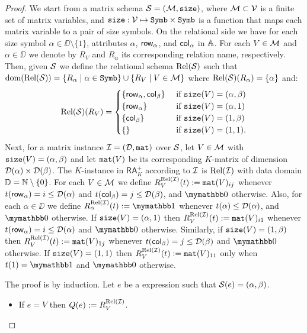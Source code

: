 \begin{proof}

We start from a matrix schema $\mathcal{S}=(\mathcal{M},\texttt{size})$, where $\mathcal{M}\subset \mathcal{V}$ is a finite set of matrix variables, 
and $\texttt{size}: \mathcal{V} \mapsto \texttt{Symb}\times \texttt{Symb}$ is a function that maps each matrix variable to a pair of size symbols. 
On the relational side we have for each size symbol $\alpha\in\DD\setminus\{1\}$, attributes $\alpha$, $\mathsf{row}_\alpha$, 
and $\mathsf{col}_\alpha$ in $\mathbb{A}$. For each $V\in\mathcal{M}$ and $\alpha \in \DD$ we denote
by $R_V$ and $R_\alpha$ its corresponding relation name, respectively. Then, given $\mathcal{S}$ we define the relational 
schema $\text{Rel}(\mathcal{S})$ such that $\operatorname{dom}(\text{Rel}(\mathcal{S})) =  \{R_\alpha \mid \alpha\in\texttt{Symb}\} \cup \{R_V \mid V \in \mathcal{M}\}$ 
where $\text{Rel}(\mathcal{S})(R_\alpha) = \{\alpha\}$ and:
\[
\text{Rel}(\mathcal{S})(R_V) = \begin{cases}
\lbrace\mathsf{row}_\alpha,\mathsf{col}_\beta \rbrace & \text{ if $ \texttt{size}(V)=(\alpha,\beta)$} \\
\lbrace\mathsf{row}_\alpha \rbrace & \text{ if $ \texttt{size}(V)=(\alpha,1)$} \\
\lbrace\mathsf{col}_\beta \rbrace  &
\text{ if $ \texttt{size}(V)=(1,\beta)$} \\
\lbrace\rbrace & \text{ if $\texttt{size}(V)=(1,1)$}.
\end{cases}
\]
Next, for a matrix instance $\mathcal{I} = (\mathcal{D},\texttt{mat})$ over $\mathcal{S}$,
let $V\in\mathcal{M}$ with $\texttt{size}(V)=(\alpha,\beta)$ and let $\texttt{mat}(V)$ be its corresponding $K$-matrix of dimension $\mathcal{D}(\alpha)\times \mathcal{D}(\beta)$.
The $K$-instance in $\mathsf{RA}_{K}^+$ according to $\mathcal{I}$ is $\text{Rel}(\mathcal{I})$ with data domain $\mathbb{D} = \mathbb{N} \setminus \{0\}$. For each $V\in\mathcal{M}$ we define 
$R_V^{\text{Rel}(\mathcal{I})}(t):=\texttt{mat}(V)_{ij}$ whenever $t(\mathsf{row}_\alpha) = i \leq \mathcal{D}(\alpha)$ and $t(\mathsf{col}_\beta) = j \leq \mathcal{D}(\beta)$, and $\kzero$ otherwise. 
Also, for each $\alpha \in \DD$ we define $R_\alpha^{\text{Rel}(\I)}(t):=\kone$ whenever $t(\alpha) \leq \mathcal{D}(\alpha)$, and $\kzero$ otherwise.
If $\texttt{size}(V)=(\alpha,1)$ then $R_V^{\text{Rel}(\mathcal{I})}(t):=\texttt{mat}(V)_{i1}$ whenever $t(\mathsf{row}_\alpha) = i \leq \mathcal{D}(\alpha)$ and $\kzero$ otherwise.
Similarly, if $\texttt{size}(V)=(1,\beta)$ then $R_V^{\text{Rel}(\mathcal{I})}(t):=\texttt{mat}(V)_{1j}$ whenever $t(\mathsf{col}_\beta) = j \leq \mathcal{D}(\beta)$ and $\kzero$ otherwise.
If $\texttt{size}(V)=(1,1)$ then $R_V^{\text{Rel}(\mathcal{I})}(t):=\texttt{mat}(V)_{11}$ only when $t(1) = \kone$ and $\kzero$ otherwise.

The proof is by induction. Let $e$ be a \langsum expression such that $\mathcal{S} (e)=(\alpha, \beta)$.
\begin{itemize}
  \item If $e=V$ then $Q (e):=R_V^{\text{Rel}(\mathcal{I})}$.


\end{itemize}
\end{proof}
